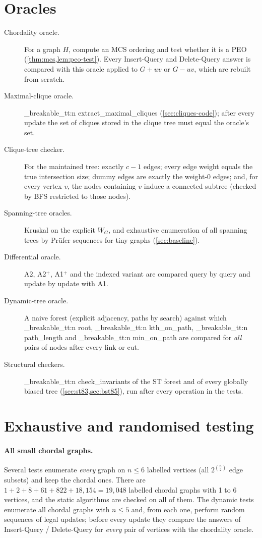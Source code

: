 \documentclass[11pt,a4paper,oneside]{report}
\theoremstyle{plain}
\theoremstyle{definition}
\theoremstyle{remark}
\newcommand{\op}[1]{\textsf{#1}}
\DeclareRobustCommand{\code}[1]{\mtp_breakable_tt:n {#1}}
\begin{document}
\section{Oracles}
\begin{description}
\item[Chordality oracle.] For a graph \(H\), compute an MCS ordering and test whether it is a
  PEO (\cref{thm:mcs,lem:peo-test}). Every \op{Insert-Query} and \op{Delete-Query} answer is
  compared with this oracle applied to \(G+uv\) or \(G-uv\), which are rebuilt from scratch.
\item[Maximal-clique oracle.] \code{extract_maximal_cliques} (\cref{sec:cliques-code}); after
  every update the set of cliques stored in the clique tree must equal the oracle's set.
\item[Clique-tree checker.] For the maintained tree: exactly \(c-1\) edges; every edge weight
  equals the true intersection size; dummy edges are exactly the weight-0 edges; and, for every
  vertex \(v\), the nodes containing \(v\) induce a connected subtree (checked by BFS
  restricted to those nodes).
\item[Spanning-tree oracles.] Kruskal on the explicit \(W_G\), and exhaustive enumeration of
  all spanning trees by Prüfer sequences for tiny graphs (\cref{sec:baseline}).
\item[Differential oracle.] A2, A2\(^+\), A1\(^+\) and the indexed variant are compared query
  by query and update by update with A1.
\item[Dynamic-tree oracle.] A naive forest (explicit adjacency, paths by search) against which
  \code{root}, \code{kth_on_path}, \code{path_length} and \code{min_on_path} are compared for
  \emph{all} pairs of nodes after every link or cut.
\item[Structural checkers.] \code{check_invariants} of the ST forest and of every globally
  biased tree (\cref{sec:st83,sec:bst85}), run after every operation in the tests.
\end{description}

\section{Exhaustive and randomised testing}
\paragraph{All small chordal graphs.} Several tests enumerate \emph{every} graph on
\(n\le 6\) labelled vertices (all \(2^{\binom n2}\) edge subsets) and keep the chordal ones.
There are \(1+2+8+61+822+18{,}154=19{,}048\) labelled chordal graphs with 1 to 6 vertices, and
the static algorithms are checked on all of them. The dynamic tests enumerate all chordal
graphs with \(n\le 5\) and, from each one, perform random sequences of legal updates; before
every update they compare the answers of \op{Insert-Query} / \op{Delete-Query} for
\emph{every} pair of vertices with the chordality oracle.
\end{document}
